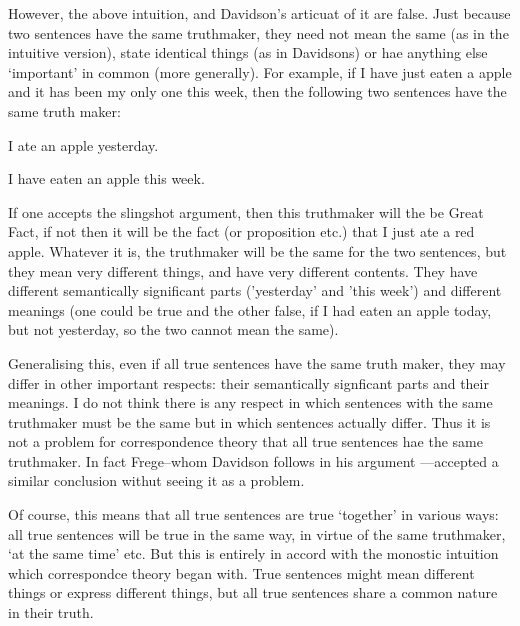 However, the above intuition, and Davidson's articuat of it are false.
Just because two sentences have the same truthmaker, they need not mean the same (as in the intuitive version), state identical things (as in Davidsons) or hae anything else `important' in common (more generally).
For example, if I have just eaten a apple and it has been my only one this week, then the following two sentences have the same truth maker:

	\begin{example} \label{yesterday} 
	I ate an apple yesterday. 
	\end{example}

	\begin{example} \label{week} 
	I have eaten an apple this week.
	\end{example}

If one accepts the slingshot argument, then this truthmaker will the be Great Fact, if not then it will be the fact (or proposition etc.) that I just ate a red apple.
Whatever it is, the truthmaker will be the same for the two sentences, but they mean very different things, and have very different contents.
They have different semantically significant parts ('yesterday' and 'this week') and different meanings (one could be true and the other false, if I had eaten an apple today, but not yesterday, so the two cannot mean the same).

Generalising this, even if all true sentences have the same truth maker, they may differ in other important respects: their semantically signficant parts and their meanings.
I do not think there is any respect in which sentences with the same truthmaker must be the same but in which sentences actually differ.
Thus it is not a problem for correspondence theory that all true sentences hae the same truthmaker.
In fact Frege--whom Davidson follows in his argument \parencite[750]{Davidson_1969}---accepted a similar conclusion withut seeing it as a problem.
\parencite[216]{Frege_1948} 

Of course, this means that all true sentences are true `together' in various ways: all true sentences will be true in the same way, in virtue of the same truthmaker, `at the same time' etc.
But this is entirely in accord with the monostic intuition which correspondce theory began with.
True sentences might mean different things or express different things, but all true sentences share a common nature in their truth.
